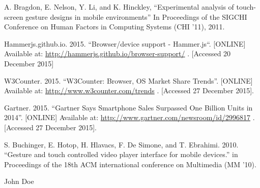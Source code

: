 \documentclass[conference]{IEEEtran}
\begin{document}
\begin{thebibliography}{1}
A. Bragdon, E. Nelson, Y. Li, and K. Hinckley, ``Experimental analysis of touch-screen gesture designs in mobile environments'' In Proceedings of the SIGCHI Conference on Human Factors in Computing Systems (CHI '11), 2011.

Hammerjs.github.io. 2015. ``Browser/device support - Hammer.js``. [ONLINE] Available at: \url{http://hammerjs.github.io/browser-support/} . [Accessed 20 December 2015]


W3Counter. 2015. ``W3Counter: Browser, OS Market Share Trends''. [ONLINE] Available at: \url{http://www.w3counter.com/trends} . [Accessed 27 December 2015].

Gartner. 2015. ``Gartner Says Smartphone Sales Surpassed One Billion Units in 2014''. [ONLINE] Available at: \url{http://www.gartner.com/newsroom/id/2996817} . [Accessed 27 December 2015].

S. Buchinger, E. Hotop, H. Hlavacs, F. De Simone, and T. Ebrahimi. 2010. ``Gesture and touch controlled video player interface for mobile devices.'' in Proceedings of the 18th ACM international conference on Multimedia (MM '10).


\end{thebibliography}

% 

\begin{IEEEbiography}{John Doe}
\blindtext
\end{IEEEbiography}







\end{document}
